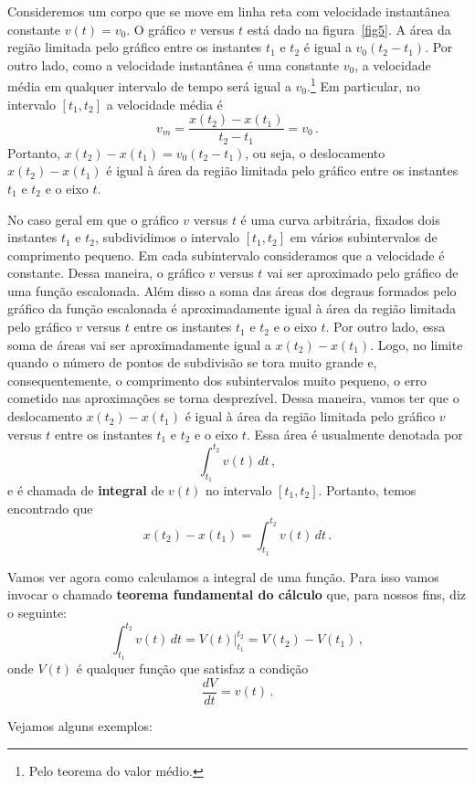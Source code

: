\documentclass[fontsize=12pt]{scrartcl}
\begin{document}
Consideremos um corpo que se move em linha reta com velocidade
instantânea constante $v(t)=v_0$. O gráfico $v$ versus $t$ está dado
na figura~\ref{fig5}. A área da região limitada pelo gráfico entre os
instantes $t_1$ e $t_2$ é igual a $v_0(t_2-t_1)$. Por outro lado, como
a velocidade instantânea é uma constante $v_0$, a velocidade média em
qualquer intervalo de tempo será igual a $v_0$.\footnote{Pelo teorema do valor médio.} Em
particular, no intervalo $[t_1,t_2]$ a velocidade média é
$$v_m=\frac{x(t_2)-x(t_1)}{t_2-t_1}=v_0\,.$$
Portanto, $x(t_2)-x(t_1)=v_0(t_2-t_1)$, ou seja, o deslocamento
$x(t_2)-x(t_1)$ é igual à área da região limitada pelo gráfico entre
os instantes $t_1$ e $t_2$ e o eixo $t$.

No caso geral em que o gráfico $v$ versus $t$ é uma curva arbitrária,
fixados dois instantes $t_1$ e $t_2$, subdividimos o intervalo
$[t_1,t_2]$ em vários subintervalos de comprimento pequeno. Em cada
subintervalo consideramos que a velocidade é constante. Dessa maneira,
o gráfico $v$ versus $t$ vai ser aproximado pelo gráfico de uma função
escalonada. Além disso a soma das áreas dos degraus formados pelo
gráfico da função escalonada é aproximadamente igual à área da região
limitada pelo gráfico $v$ versus $t$ entre os instantes $t_1$ e $t_2$
e o eixo $t$. Por outro lado, essa soma de áreas vai ser
aproximadamente igual a $x(t_2)-x(t_1)$. Logo, no limite quando o
número de pontos de subdivisão se tora muito grande e,
consequentemente, o comprimento dos subintervalos muito pequeno, o
erro cometido nas aproximações se torna desprezível. Dessa maneira,
vamos ter que o deslocamento $x(t_2)-x(t_1)$ é igual à área da região
limitada pelo gráfico $v$ versus $t$ entre os instantes $t_1$ e $t_2$
e o eixo $t$. Essa área é usualmente denotada por
$$\int_{t_1}^{t_2}v(t)\,dt\,,$$
e é chamada de \textbf{integral} de $v(t)$ no intervalo
$[t_1,t_2]$. Portanto, temos encontrado que
$$x(t_2)-x(t_1)=\int_{t_1}^{t_2}v(t)\,dt\,.$$

Vamos ver agora como calculamos a integral de uma função. Para isso
vamos invocar o chamado \textbf{teorema fundamental do cálculo} que,
para nossos fins, diz o seguinte:
$$\int_{t_1}^{t_2}v(t)\,dt=V(t)|_{t_1}^{t_2}=V(t_2)-V(t_1)\,,$$
onde $V(t)$ é qualquer função que satisfaz a condição
$$\frac{dV}{dt}=v(t)\,.$$

Vejamos alguns exemplos:
\end{document}

